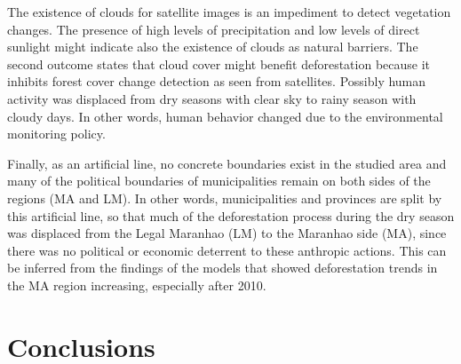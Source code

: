 
The existence of clouds for satellite images is an impediment to detect vegetation changes. The presence of high levels of precipitation and low levels of direct sunlight might indicate also the existence of clouds as natural barriers. The second outcome states that cloud cover might benefit deforestation because it inhibits forest cover change detection as seen from satellites. Possibly human activity was displaced from dry seasons with clear sky to rainy season with cloudy days. In other words, human behavior changed due to the environmental monitoring policy. 


Finally, as an artificial line, no concrete boundaries exist in the studied area and many of the political boundaries of municipalities remain on both sides of the regions (MA and LM). In other words, municipalities and provinces are split by this artificial line, so that much of the deforestation process during the dry season was displaced from the Legal Maranhao (LM) to the Maranhao side (MA), since there was no political or economic deterrent to these anthropic actions. This can be inferred from the findings of the models that showed deforestation trends in the MA region increasing, especially after 2010. 




\section{Conclusions}

